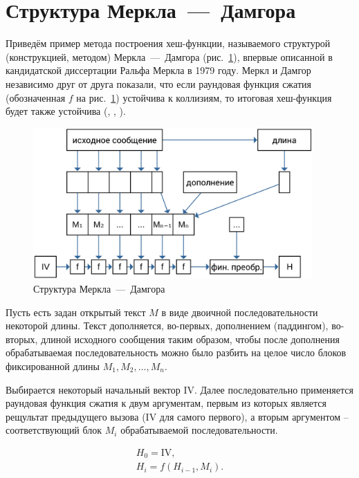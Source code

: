 \section{Структура Меркла~---~Дамгора}

Приведём пример метода построения хеш-функции, называемого структурой (конструкцией, методом) Меркла~---~Дамгора (рис.~\ref{fig:merkle-damgard}), впервые описанной в кандидатской диссертации Ральфа Меркла в 1979 году. Меркл и Дамгор независимо друг от друга показали, что если раундовая функция сжатия (обозначенная $f$ на рис.~\ref{fig:merkle-damgard}) устойчива к коллизиям, то итоговая хеш-функция будет также устойчива (, , \cite{Merkle:1979, Merkle:1990, Damgard:1990}).

\begin{figure}[htb]
    \centering
    \includegraphics[width=0.95\textwidth]{pic/merkle-damgard}
    \caption{Структура Меркла~---~Дамгора}
    \label{fig:merkle-damgard}
\end{figure}

Пусть есть задан открытый текст $M$ в виде двоичной последовательности некоторой длины. Текст дополняется, во-первых, дополнением (паддингом), во-вторых, длиной исходного сообщения таким образом, чтобы после дополнения обрабатываемая последовательность можно было разбить на целое число блоков фиксированной длины $M_1, M_2, \dots, M_n$.

Выбирается некоторый начальный вектор IV. Далее последовательно применяется раундовая функция сжатия к двум аргументам, первым из которых является рещультат предыдущего вызова (IV для самого первого), а вторым аргументом -- соответствующий блок $M_i$ обрабатываемой последовательности.

\[\begin{array}{l}
H_0 = \text{IV},\\
H_i = f ( H_{i-1}, M_i ).\\
\end{array}\]

